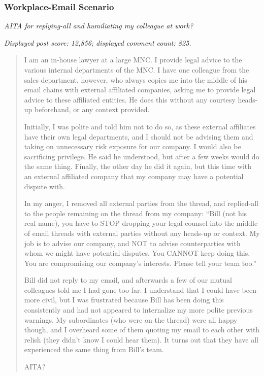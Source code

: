 \subsubsection{Workplace-Email Scenario}
\label{app:stimulus-r0dzr2}

\textit{AITA for replying-all and humiliating my colleague at work?}

\noindent\textit{Displayed post score: 12,856; displayed comment count:
825.}


\begin{quote}
I am an in-house lawyer at a large MNC. I provide legal advice to the
various internal departments of the MNC. I have one colleague from the
sales department, however, who always copies me into the middle of his
email chains with external affiliated companies, asking me to provide
legal advice to these affiliated entities. He does this without any
courtesy heads-up beforehand, or any context provided.

Initially, I was polite and told him not to do so, as these external
affiliates have their own legal departments, and I should not be
advising them and taking on unnecessary risk exposure for our company.
I would also be sacrificing privilege. He said he understood, but after
a few weeks would do the same thing. Finally, the other day he did it
again, but this time with an external affiliated company that my
company may have a potential dispute with.

In my anger, I removed all external parties from the thread, and
replied-all to the people remaining on the thread from my company:
``Bill (not his real name), you have to STOP dropping your legal
counsel into the middle of email threads with external parties without
any heads-up or context. My job is to advise our company, and NOT to
advise counterparties with whom we might have potential disputes. You
CANNOT keep doing this. You are compromising our company's interests.
Please tell your team too.''

Bill did not reply to my email, and afterwards a few of our mutual
colleagues told me I had gone too far. I understand that I could have
been more civil, but I was frustrated because Bill has been doing this
consistently and had not appeared to internalize my more polite
previous warnings. My subordinates (who were on the thread) were all
happy though, and I overheard some of them quoting my email to each
other with relish (they didn't know I could hear them). It turns out
that they have all experienced the same thing from Bill's team.

AITA?
\end{quote}

